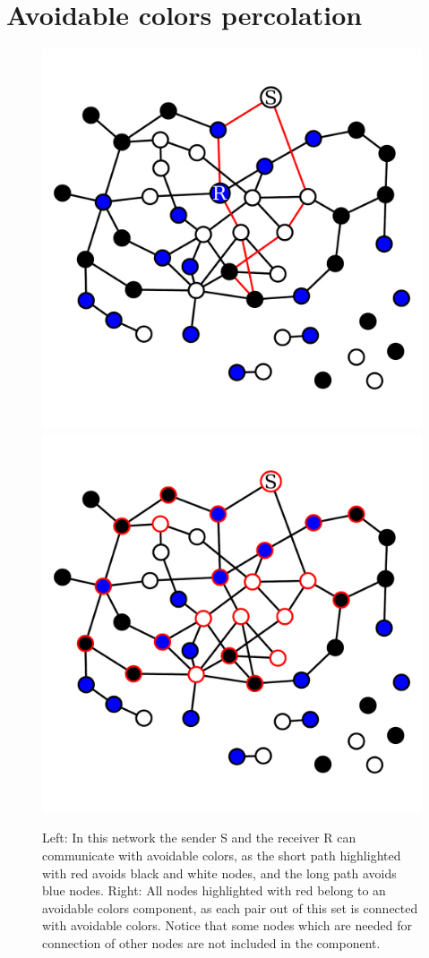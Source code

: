 \documentclass[aps, pre, twocolumn, a4paper, superscriptaddress, floatfix]{revtex4}
\begin{document}
%
%
%
%



\section{Avoidable colors percolation}

\begin{figure}[htb]
\begin{center}
    \includegraphics[width=0.49\columnwidth]{graph_sr.pdf}
    \includegraphics[width=0.49\columnwidth]{graph_Gcolor.pdf}
    \caption{Left: In this network the sender S and the receiver R can communicate 
    with avoidable colors, as the short path highlighted with red avoids black and 
    white nodes, and the long path avoids blue nodes. Right: All nodes highlighted 
    with red belong to an avoidable colors component, as each pair out of this set 
    is connected with avoidable colors. Notice that some nodes which are needed 
    for connection of other nodes are not included in the component.}
    \label{fig:avoidable_colors}
\end{center}
\end{figure}
\end{document}
